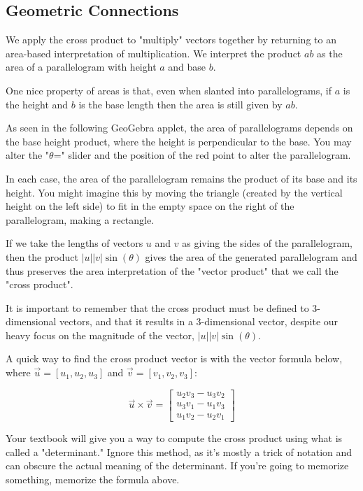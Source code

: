 \documentclass{ximera}
\begin{document}
\subsection*{Geometric Connections}
We apply the cross product to "multiply" vectors together by returning to an area-based interpretation of multiplication. We interpret the product $ab$ as the area of a parallelogram with height $a$ and base $b$. 

One nice property of areas is that, even when slanted into parallelograms, if $a$ is the height and $b$ is the base length then the area is still given by $ab$.

As seen in the following GeoGebra applet, the area of parallelograms depends on the base height product, where the height is perpendicular to the base. You may alter the "$\theta$=" slider and the position of the red point to alter the parallelogram.

\begin{center}
\end{center}

In each case, the area of the parallelogram remains the product of its base and its height. You might imagine this by moving the triangle (created by the vertical height on the left side) to fit in the empty space on the right of the parallelogram, making a rectangle.

If we take the lengths of vectors $u$ and $v$ as giving the sides of the parallelogram, then the product $|u||v|\sin(\theta)$ gives the area of the generated parallelogram and thus preserves the area interpretation of the "vector product" that we call the "cross product".

It is important to remember that the cross product must be defined to 3-dimensional vectors, and that it results in a 3-dimensional vector, despite our heavy focus on the magnitude of the vector, $|u||v|\sin(\theta)$.

\begin{definition}
    A quick way to find the cross product vector is with the vector formula below, where $\vec{u}=[u_1,u_2,u_3]$ and $\vec{v}=[v_1,v_2,v_3]$: 

    \[\vec{u}\times \vec{v} = 
    \begin{bmatrix}
    u_2 v_3 - u_3 v_2 \\
    u_3 v_1 - u_1 v_3 \\
    u_1 v_2 - u_2 v_1
    \end{bmatrix}\]
\end{definition}

\begin{remark}
Your textbook will give you a way to compute the cross product using what is called a "determinant." Ignore this method, as it's mostly a trick of notation and can obscure the actual meaning of the determinant. If you're going to memorize something, memorize the formula above.
\end{remark}
\end{document}

